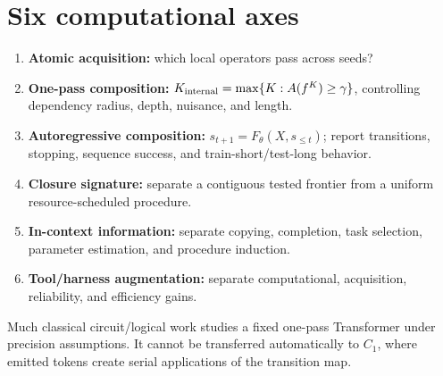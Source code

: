 \documentclass[10pt]{article}
\begin{document}
\section{Six computational axes}
\begin{enumerate}
\item \textbf{Atomic acquisition:} which local operators pass across seeds?
\item \textbf{One-pass composition:} $K_{\rm internal}=\max\{K:A(f^K)\ge\gamma\}$, controlling dependency radius, depth, nuisance, and length.
\item \textbf{Autoregressive composition:} $s_{t+1}=F_\theta(X,s_{\le t})$; report transitions, stopping, sequence success, and train-short/test-long behavior.
\item \textbf{Closure signature:} separate a contiguous tested frontier from a uniform resource-scheduled procedure.
\item \textbf{In-context information:} separate copying, completion, task selection, parameter estimation, and procedure induction.
\item \textbf{Tool/harness augmentation:} separate computational, acquisition, reliability, and efficiency gains.
\end{enumerate}
Much classical circuit/logical work studies a fixed one-pass Transformer under precision assumptions. It cannot be transferred automatically to $C_1$, where emitted tokens create serial applications of the transition map.
\end{document}
